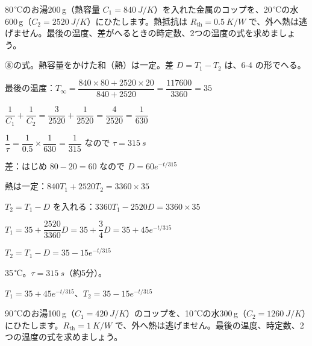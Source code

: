\begin{reidai}[2つの物の温度]
80\,℃のお湯200\,g（熱容量 $C_1=\qty{840}{J/K}$）を入れた金属のコップを、20\,℃の水600\,g（$C_2=\qty{2520}{J/K}$）にひたします。熱抵抗は $R_{\mathrm{th}}=\qty{0.5}{K/W}$ で、外へ熱は逃げません。最後の温度、差がへるときの時定数、2つの温度の式を求めましょう。\par
\kangaekata ⑧の式。熱容量をかけた和（熱）は一定。差 $D=T_1-T_2$ は、6-4 の形でへる。\par
\shiki\kvios{}\zw{} 最後の温度：$T_\infty=\dfrac{840\times80+2520\times20}{840+2520}=\dfrac{\num{117600}}{3360}=35$\par
\kvioa $\dfrac{1}{C_1}+\dfrac{1}{C_2}=\dfrac{3}{2520}+\dfrac{1}{2520}=\dfrac{4}{2520}=\dfrac{1}{630}$\par
\kvioa $\dfrac{1}{\tau}=\dfrac{1}{0.5}\times\dfrac{1}{630}=\dfrac{1}{315}$ なので $\tau=\qty{315}{s}$\par
\kvioa 差：はじめ $80-20=60$ なので $D=60e^{-t/315}$\par
\kvioa 熱は一定：$840T_1+2520T_2=3360\times35$\par
\kvioa $T_2=T_1-D$ を入れる：$3360T_1-2520D=3360\times35$\par
\kviob $T_1=35+\dfrac{2520}{3360}D=35+\dfrac{3}{4}D=35+45e^{-t/315}$\par
\kviob $T_2=T_1-D=35-15e^{-t/315}$\par
\kotae\kvios{}\zw{} 35\,℃。$\tau=\qty{315}{s}$（約5分）。\par
\kvioa $T_1=35+45e^{-t/315}$、$T_2=35-15e^{-t/315}$
\end{reidai}
\begin{jibun}
90\,℃のお湯100\,g（$C_1=\qty{420}{J/K}$）のコップを、10\,℃の水300\,g（$C_2=\qty{1260}{J/K}$）にひたします。$R_{\mathrm{th}}=\qty{1}{K/W}$ で、外へ熱は逃げません。最後の温度、時定数、2つの温度の式を求めましょう。
\end{jibun}



